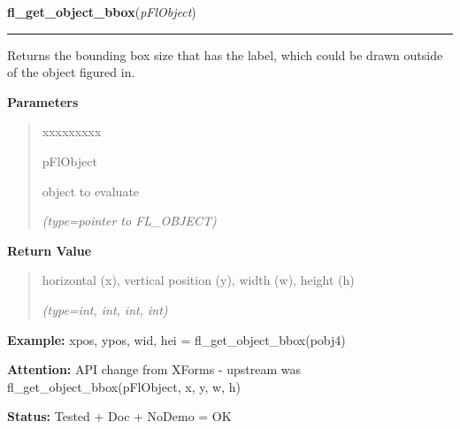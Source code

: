     \vspace{0.5ex}

\hspace{.8\funcindent}\begin{boxedminipage}{\funcwidth}

    \raggedright \textbf{fl\_get\_object\_bbox}(\textit{pFlObject})

    \vspace{-1.5ex}

    \rule{\textwidth}{0.5\fboxrule}
\setlength{\parskip}{2ex}
    Returns the bounding box size that has the label, which could be drawn 
    outside of the object figured in.

\setlength{\parskip}{1ex}
      \textbf{Parameters}
      \vspace{-1ex}

      \begin{quote}
        \begin{Ventry}{xxxxxxxxx}

          \item[pFlObject]

          object to evaluate

            {\it (type=pointer to FL\_OBJECT)}

        \end{Ventry}

      \end{quote}

      \textbf{Return Value}
    \vspace{-1ex}

      \begin{quote}
      horizontal (x), vertical position (y), width (w), height (h)

      {\it (type=int, int, int, int)}

      \end{quote}

\textbf{Example:} xpos, ypos, wid, hei = fl\_get\_object\_bbox(pobj4)



\textbf{Attention:} API change from XForms - upstream was fl\_get\_object\_bbox(pFlObject, x, 
y, w, h)



\textbf{Status:} Tested + Doc + NoDemo = OK



    \end{boxedminipage}

    \label{xformslib:flbasic:fl_get_object_bbox}

